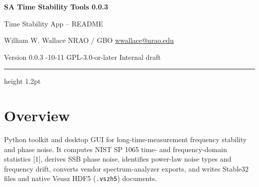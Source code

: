 \documentclass[10pt,a4paper]{article}
\begin{document}
\thispagestyle{plain}
\begin{center}
  {\sffamily\bfseries\huge\color{accent} SA Time Stability Tools 0.0.3\par}
  \vspace{4pt}
  {\sffamily\Large Time Stability App -- README\par}
  \vspace{8pt}
  {\normalsize William W. Wallace \quad NRAO / GBO \quad
   \href{mailto:wwallace@nrao.edu}{wwallace@nrao.edu}\par}
  \vspace{2pt}
  {\small Version 0.0.3 -10-11 \quad GPL-3.0-or-later \quad Internal draft\par}
\end{center}
\vspace{4pt}
{\color{accent}\hrule height 1.2pt}
\vspace{6pt}

\renewcommand{\contentsname}{Table of contents}
{\small\tableofcontents}
\clearpage


\hypertarget{overview}{%
\section*{Overview}\label{overview}}

Python toolkit and desktop GUI for long-time-measurement frequency stability
and phase noise. It computes NIST SP 1065 time- and frequency-domain
statistics {[}1{]}, derives SSB phase noise, identifies power-law noise types and
frequency drift, converts vendor spectrum-analyzer exports, and writes
Stable32 files and native Veusz HDF5 (\texttt{.\allowbreak{}vszh5}) documents.
\end{document}
